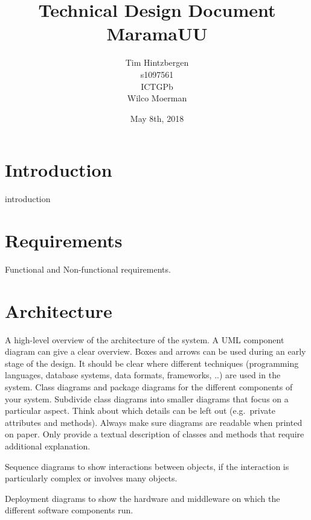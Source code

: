 \documentclass[10pt]{extarticle} %
\title{\huge Technical Design Document MaramaUU}
\author{Tim Hintzbergen    \\s1097561
\\ICTGPb
\\Wilco Moerman}
\date{May 8th, 2018}
\begin{document}
    \maketitle
    \thispagestyle{empty}
    \newpage
    \newpage
    \setcounter{page}{1}
    \section {Introduction}
    introduction
    \newpage

    \tableofcontents{}
    \newpage

    \section{Requirements}
    Functional and Non-functional requirements.
    \newpage

    \section{Architecture}
    A high-level overview of the architecture of the system.
    A UML component diagram can give a clear overview.
    Boxes and arrows can be used during an early stage of the design.
    It should be clear where different techniques (programming languages, database systems, data formats, frameworks, ..) are used in the system.
    Class diagrams and package diagrams for the different components of your system.
    Subdivide class diagrams into smaller diagrams that focus on a particular aspect.
    Think about which details can be left out (e.g.\ private attributes and methods).
    Always make sure diagrams are readable when printed on paper.
    Only provide a textual description of classes and methods that require additional explanation.

    Sequence diagrams to show interactions between objects, if the interaction is particularly complex or involves many objects.

    Deployment diagrams to show the hardware and middleware on which the different software components run.
\end{document}
